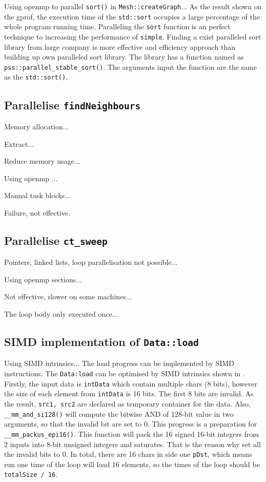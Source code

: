 \documentclass[conference]{IEEEtran}
\begin{document}
Using openmp to parallel \texttt{sort()} in \texttt{Mesh::createGraph}...
As the result shown on the gprof, the execution time of the \texttt{std::sort} occupies a large percentage of the whole program running time. Paralleling the \texttt{sort} function is an perfect technique to increasing the performance of \texttt{simple}. Finding a exist paralleled sort library from large company is more effective and efficiency approach than building up own paralleled sort library. \cite{parallelsort} The library has a function named as \texttt{pss::parallel\_stable\_sort()}. The arguments input the function are the same as the \texttt{std::sort()}. 

\subsection{Parallelise \texttt{findNeighbours}}

Memory allocation...

Extract...

Reduce memory usage...

Using openmp \cite{dagum1998openmp}...

Manual task blocks...

Failure, not effective.

\subsection{Parallelise \texttt{ct\_sweep}}

Pointers, linked lists, loop parallelisation not possible...

Using openmp sections...

Not effective, slower on some machines...

The loop body only executed once...

\subsection{SIMD implementation of \texttt{Data::load}}

Using SIMD intrinsics...
The load progress can be implemented by SIMD instructions. The \texttt{Data:load} can be optimised by SIMD intrinsics shown in \cite{advnotes}. Firstly, the input data is \texttt{intData} which contain multiple chars (8 bits), however the size of each element from \texttt{intData} is 16 bits. The first 8 bits are invalid. As the result, \texttt{src1, src2} are declared as temporary container for the data. Also, \texttt{\_\_mm\_and\_si128()} will compute the bitwise AND of 128-bit value in two arguments, so that the invalid bit are set to 0. This progress is a preparation for \texttt{\_\_mm\_packus\_epi16()}. This function will pack the 16 signed 16-bit integers from 2 inputs into 8-bit unsigned integers and saturates. That is the reason why set all the invalid bits to 0. In total, there are 16 chars in side one \texttt{pDst}, which means run one time of the loop will load 16 elements, so the times of the loop should be \texttt{totalSize / 16}.
\end{document}
